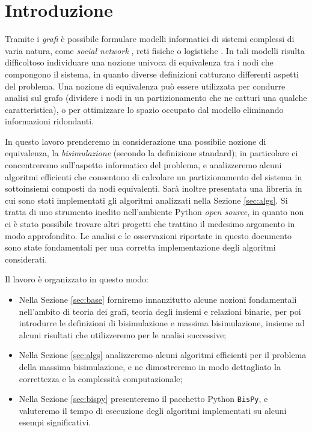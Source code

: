 \section*{Introduzione}

Tramite i \emph{grafi} è possibile formulare modelli informatici di sistemi complessi di varia natura, come \emph{social network} \cite{twitter}, reti fisiche \cite{electric} o logistiche \cite{supply}. In tali modelli risulta difficoltoso individuare una nozione univoca di equivalenza tra i nodi che compongono il sistema, in quanto diverse definizioni catturano differenti aspetti del problema. Una nozione di equivalenza può essere utilizzata per condurre analisi sul grafo (dividere i nodi in un partizionamento che ne catturi una qualche caratteristica), o per ottimizzare lo spazio occupato dal modello eliminando informazioni ridondanti.

In questo lavoro prenderemo in considerazione una possibile nozione di equivalenza, la \emph{bisimulazione} (secondo la definizione standard); in particolare ci concentreremo sull'aspetto informatico del problema, e analizzeremo alcuni algoritmi efficienti che consentono di calcolare un partizionamento del sistema in sottoinsiemi composti da nodi equivalenti. Sarà inoltre presentata una libreria in cui sono stati implementati gli algoritmi analizzati nella Sezione \ref{sec:algs}. Si tratta di uno strumento inedito nell'ambiente Python \emph{open source}, in quanto non ci è stato possibile trovare altri progetti che trattino il medesimo argomento in modo approfondito. Le analisi e le osservazioni riportate in questo documento sono state fondamentali per una corretta implementazione degli algoritmi considerati.

Il lavoro è organizzato in questo modo:
\begin{itemize}
    \item Nella Sezione \ref{sec:base} forniremo innanzitutto alcune nozioni fondamentali nell'ambito di teoria dei grafi, teoria degli insiemi e relazioni binarie, per poi introdurre le definizioni di bisimulazione e massima bisimulazione, insieme ad alcuni risultati che utilizzeremo per le analisi successive;
    \item Nella Sezione \ref{sec:algs} analizzeremo alcuni algoritmi efficienti per il problema della massima bisimulazione, e ne dimostreremo in modo dettagliato la correttezza e la complessità computazionale;
    \item Nella Sezione \ref{sec:bispy} presenteremo il pacchetto Python \texttt{BisPy}, e valuteremo il tempo di esecuzione degli algoritmi implementati su alcuni esempi significativi.
\end{itemize}
